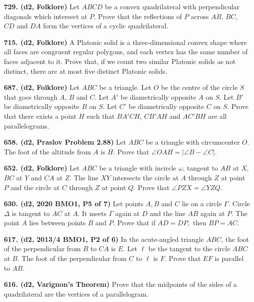\documentclass{article}
\begin{document}
\textbf{729. (\color{red}d2\color{black}, Folklore)} Let $ABCD$ be a convex quadrilateral with perpendicular diagonals which intersect at $P$. Prove that the reflections of $P$ across $AB$, $BC$, $CD$ and $DA$ form the vertices of a cyclic quadrilateral.

\textbf{715. (\color{red}d2\color{black}, Folklore)} A Platonic solid is a three-dimensional convex shape where all faces are congruent regular polygons, and each vertex has the same number of faces adjacent to it. Prove that, if we count two similar Platonic solids as not distinct, there are at most five distinct Platonic solids.

\textbf{687. (\color{red}d2\color{black}, Folklore)} Let $ABC$ be a triangle. Let $O$ be the centre of the circle $S$ that goes through $A$, $B$ and $C$. Let $A'$ be diametrically opposite $A$ on $S$. Let $B'$ be diametrically opposite $B$ on $S$. Let $C'$ be diametrically opposite $C$ on $S$. Prove that there exists a point $H$ such that $BA'CH$, $CB'AH$ and $AC'BH$ are all parallelograms.

\textbf{658. (\color{red}d2\color{black}, Praslov Problem 2.88)} Let $ABC$ be a triangle with circumcenter $O$. The foot of the altitude from $A$ is $H$. Prove that $\angle OAH = |\angle B - \angle C|$.

\textbf{652. (\color{red}d2\color{black}, Folklore)} Let $ABC$ be a triangle with incircle $\omega$, tangent to $AB$ at $X$, $BC$ at $Y$ and $CA$ at $Z$. The line $XY$ intersects the circle at $A$ through $Z$ at point $P$ and the circle at $C$ through $Z$ at point $Q$. Prove that $\angle PZX = \angle YZQ$.



\textbf{630. (\color{red}d2\color{black}, 2020 BMO1, P5 of 7)} Let points $A, B$ and $C$ lie on a circle $\Gamma .$ Circle $\Delta$ is tangent to $A C$ at $A .$ It meets $\Gamma$ again at $D$ and the line $A B$ again at $P .$ The point $A$ lies between points $B$ and $P .$ Prove that if $A D=D P,$ then $B P=A C .$

\textbf{617. (\color{red}d2\color{black}, 2013/4 BMO1, P2 of 6)} In the acute-angled triangle $ABC$, the foot of the perpendicular from $B$ to $CA$ is $E$. Let $\ell$ be the tangent to the circle $ABC$ at $B$. The foot of the perpendicular from $C$ to $\ell$ is $F$. Prove that $EF$ is parallel to $AB$.

\textbf{616. (\color{red}d2\color{black}, Varignon's Theorem)} Prove that the midpoints of the sides of a quadrilateral are the vertices of a parallelogram.
\end{document}
